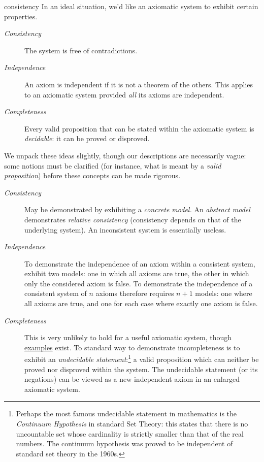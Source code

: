 \begin{defn}{}{consistency}
	In an ideal situation, we'd like an axiomatic system to exhibit certain properties.
	\begin{description}
		\item[\normalfont\emph{Consistency}] The system is free of contradictions.
		\item[\normalfont\emph{Independence}] An axiom is independent if it is not a theorem of the others. This applies to an axiomatic system provided \emph{all} its axioms are independent. 
		\item[\normalfont\emph{Completeness}] Every valid proposition that can be stated within the axiomatic system is \emph{decidable}: it can be proved or disproved.
	\end{description}
\end{defn}

We unpack these ideas slightly, though our descriptions are necessarily vague: some notions must be clarified (for instance, what is meant by a \emph{valid proposition}) before these concepts can be made rigorous.
\begin{description}
	\item[\normalfont\emph{Consistency}] May be demonstrated by exhibiting a \emph{concrete model.} An \emph{abstract model} demonstrates \emph{relative consistency} (consistency depends on that of the underlying system). An inconsistent system is essentially useless.
	\item[\normalfont\emph{Independence}] To demonstrate the independence of an axiom within a consistent system, exhibit two models: one in which all axioms are true, the other in which only the considered axiom is false. To demonstrate the independence of a consistent system of $n$ axioms therefore requires $n+1$ models: one where all axioms are true, and one for each case where exactly one axiom is false. 
	\item[\normalfont\emph{Completeness}] This is very unlikely to hold for a useful axiomatic system, though \href{https://en.wikipedia.org/wiki/Complete_theory}{examples} exist. To standard way to demonstrate incompleteness is to exhibit an \emph{undecidable statement}:\footnote{%
	Perhaps the most famous undecidable statement in mathematics is the \emph{Continuum Hypothesis} in standard Set Theory: this states that there is no uncountable set whose cardinality is strictly smaller than that of the real numbers. The continuum hypothesis was proved to be independent of standard set theory in the 1960s.%
}  a valid proposition which can neither be proved nor disproved within the system. The undecidable statement (or its negations) can be viewed as a new independent axiom in an enlarged axiomatic system.
\end{description}




